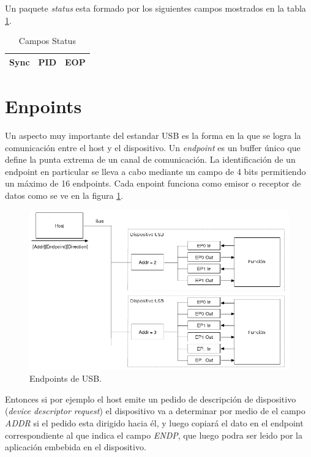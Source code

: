 Un paquete \emph{status} esta formado por los siguientes campos mostrados en la
tabla \ref{tab:usb_status_fields}.

\begin{table}[h]
\centering
\begin{tabular}{|c|c|c|} \hline
Sync & PID & EOP\\ \hline
\end{tabular}
\caption{Campos Status} 
\label{tab:usb_status_fields}
\end{table}


\section{Enpoints}
Un aspecto muy importante del estandar USB es la forma en la que se logra la
comunicaci\'on entre el host y el dispositivo.
Un \emph{endpoint} es un buffer \'unico que define la punta extrema de un
canal de comunicaci\'on. La identificaci\'on de un endpoint en particular se
lleva a cabo mediante un campo de 4 bits permitiendo un m\'aximo de 16
endpoints. Cada enpoint funciona como emisor o receptor de datos como se ve en
la figura \ref{fig:usb_endpoints}.

\begin{figure}
\centering
\includegraphics[scale=0.5]{./img/usb_endpoints.png}
\caption{Endpoints de USB.}
\label{fig:usb_endpoints}
\end{figure}

Entonces si por ejemplo el host emite un pedido de descripci\'on de dispositivo
(\emph{device descriptor request}) el dispositivo va a determinar por medio de
el campo \emph{ADDR} si el pedido esta dirigido hacia \'el, y luego copiar\'a
el dato en el endpoint correspondiente al que indica el campo \emph{ENDP}, que
luego podra ser leido por la aplicaci\'on embebida en el dispositivo.\\

